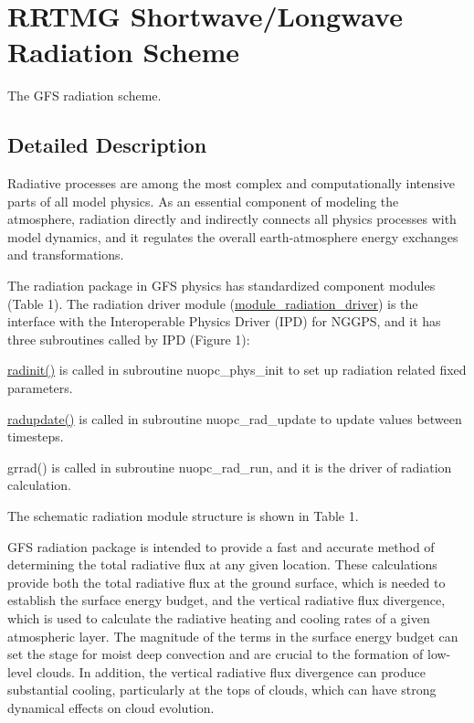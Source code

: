 \hypertarget{group__rad}{}\section{R\+R\+T\+MG Shortwave/\+Longwave Radiation Scheme}
\label{group__rad}


The G\+FS radiation scheme.  




\subsection{Detailed Description}
Radiative processes are among the most complex and computationally intensive parts of all model physics. As an essential component of modeling the atmosphere, radiation directly and indirectly connects all physics processes with model dynamics, and it regulates the overall earth-\/atmosphere energy exchanges and transformations.

The radiation package in G\+FS physics has standardized component modules (Table 1). The radiation driver module (\hyperlink{group__module__radiation__driver}{module\+\_\+radiation\+\_\+driver}) is the interface with the Interoperable Physics Driver (I\+PD) for N\+G\+G\+PS, and it has three subroutines called by I\+PD (Figure 1)\+:
\begin{DoxyItemize}
\item \hyperlink{group__module__radiation__driver_ga3d4ef1d77b7d7ef09fafcb4413e1cbf2}{radinit()} is called in subroutine nuopc\+\_\+phys\+\_\+init to set up radiation related fixed parameters.
\item \hyperlink{group__module__radiation__driver_ga28280ee9ea8ee0d183ab9d541a31b718}{radupdate()} is called in subroutine nuopc\+\_\+rad\+\_\+update to update values between timesteps.
\item grrad() is called in subroutine nuopc\+\_\+rad\+\_\+run, and it is the driver of radiation calculation. 
\end{DoxyItemize}

The schematic radiation module structure is shown in Table 1. 

G\+FS radiation package is intended to provide a fast and accurate method of determining the total radiative flux at any given location. These calculations provide both the total radiative flux at the ground surface, which is needed to establish the surface energy budget, and the vertical radiative flux divergence, which is used to calculate the radiative heating and cooling rates of a given atmospheric layer. The magnitude of the terms in the surface energy budget can set the stage for moist deep convection and are crucial to the formation of low-\/level clouds. In addition, the vertical radiative flux divergence can produce substantial cooling, particularly at the tops of clouds, which can have strong dynamical effects on cloud evolution.

